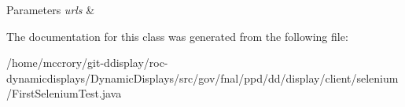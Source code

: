\begin{DoxyParams}{Parameters}
{\em urls} & \\
\hline
\end{DoxyParams}


The documentation for this class was generated from the following file\-:\begin{DoxyCompactItemize}
\item 
/home/mccrory/git-\/ddisplay/roc-\/dynamicdisplays/\-Dynamic\-Displays/src/gov/fnal/ppd/dd/display/client/selenium/First\-Selenium\-Test.\-java\end{DoxyCompactItemize}
